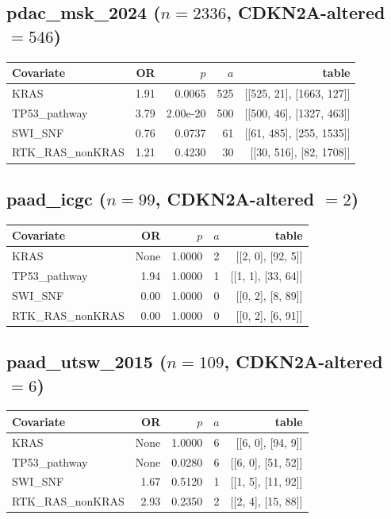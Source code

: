 \subsection{pdac\_msk\_2024 ($n=2336$, CDKN2A-altered $=546$)}
\begin{center}\begin{tabular}{lrrrr}
\hline\hline Covariate & OR & $p$ & $a$ & table \\ \hline
KRAS & 1.91 & 0.0065 & 525 & [[525, 21], [1663, 127]] \\
TP53\_pathway & 3.79 & 2.00e-20 & 500 & [[500, 46], [1327, 463]] \\
SWI\_SNF & 0.76 & 0.0737 & 61 & [[61, 485], [255, 1535]] \\
RTK\_RAS\_nonKRAS & 1.21 & 0.4230 & 30 & [[30, 516], [82, 1708]] \\
\hline\hline\end{tabular}\end{center}
\subsection{paad\_icgc ($n=99$, CDKN2A-altered $=2$)}
\begin{center}\begin{tabular}{lrrrr}
\hline\hline Covariate & OR & $p$ & $a$ & table \\ \hline
KRAS & None & 1.0000 & 2 & [[2, 0], [92, 5]] \\
TP53\_pathway & 1.94 & 1.0000 & 1 & [[1, 1], [33, 64]] \\
SWI\_SNF & 0.00 & 1.0000 & 0 & [[0, 2], [8, 89]] \\
RTK\_RAS\_nonKRAS & 0.00 & 1.0000 & 0 & [[0, 2], [6, 91]] \\
\hline\hline\end{tabular}\end{center}
\subsection{paad\_utsw\_2015 ($n=109$, CDKN2A-altered $=6$)}
\begin{center}\begin{tabular}{lrrrr}
\hline\hline Covariate & OR & $p$ & $a$ & table \\ \hline
KRAS & None & 1.0000 & 6 & [[6, 0], [94, 9]] \\
TP53\_pathway & None & 0.0280 & 6 & [[6, 0], [51, 52]] \\
SWI\_SNF & 1.67 & 0.5120 & 1 & [[1, 5], [11, 92]] \\
RTK\_RAS\_nonKRAS & 2.93 & 0.2350 & 2 & [[2, 4], [15, 88]] \\
\hline\hline\end{tabular}\end{center}
